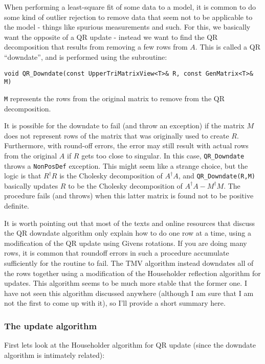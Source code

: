 \documentclass[twoside,letterpaper,11pt]{article}
\renewcommand{\tt}[1]{{\texttt {#1}}}
\begin{document}
When performing a least-square fit of some data to a model,
it is common to do some kind of outlier rejection to remove data that
seem not to be applicable to the model - things like spurious measurements
and such.
For this, we basically want the opposite of a QR update - instead we want to 
find the QR decomposition that results from
removing a few rows from $A$.  This is called a QR ``downdate'', and is performed
using the subroutine:
\begin{verbatim}
void QR_Downdate(const UpperTriMatrixView<T>& R, const GenMatrix<T>& M)
\end{verbatim}
\tt{M} represents the rows from the original matrix to remove from the 
QR decomposition.

It is possible for the downdate to fail (and throw an exception) 
if the matrix $M$ does not represent rows
of the matrix that was originally used to create $R$.
Furthermore,
with round-off errors, the error may still result with actual rows from the 
original $A$
if $R$ gets too close to singular.  In this case, \tt{QR\_Downdate} throws
a \tt{NonPosDef} exception.  This might seem like a strange choice, but the 
logic is that $R^\dagger R$ is the Cholesky decomposition of $A^\dagger A$,
and \tt{QR\_Downdate(R,M)} basically updates $R$ to be the Cholesky decomposition
of $A^\dagger A - M^\dagger M$.  The procedure fails (and throws) when this latter 
matrix is found not to be positive definite.

It is worth pointing out that most of the texts and online resources that discuss the 
QR downdate algorithm only explain how to do one row at a time, using a 
modification of the QR update using Givens rotations.  
If you are doing many rows, it is common that roundoff errors in such a 
procedure accumulate sufficiently for the routine to fail.  The TMV algorithm
instead downdates all of the rows together using a modification of the 
Householder reflection algorithm for updates.  This algorithm seems to be
much more stable that the former one.  I have not seen this algorithm discussed
anywhere (although I am sure that I am not the first to come up with it), so
I'll provide a short summary here.

\subsubsection{The update algorithm}

First lets look at the Householder algorithm for QR update (since the downdate algorithm
is intimately related):
\end{document}
